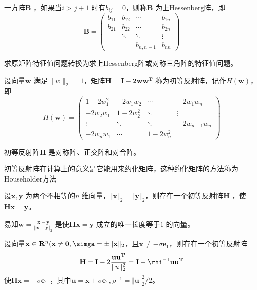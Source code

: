 \documentclass[a4paper]{article}
\begin{document}
\begin{definition}
	一方阵$\mathbf{B}$ ，如果当$i > j+1$ 时有$b_{ij} = 0$，则称$\mathbf{B}$ 为上Hessenberg阵，即
	\[
	\mathbf{B} = \begin{pmatrix} 
		b_{11} & b_{12} & \cdots & b_{1n} \\
		b_{21} & b_{22} & \cdots & b_{2n} \\
		       & \ddots & \ddots & \vdots \\
		       & & b_{n, n-1} & b_{nn}
		\end{pmatrix} 
	\] 
\end{definition}

求原矩阵特征值问题转换为求上Hessenberg阵或对称三角阵的特征值问题。

\begin{definition}
	设向量$\mathbf{w}$ 满足$\| w \|_2 = 1$，矩阵$\mathbf{H = I - 2 w w^{T}}$ 称为初等反射阵，记作$H(\mathbf{w})$，即
	\[
	H(\mathbf{w}) = \begin{pmatrix} 
		1 - 2 w_1^2 & -2 w_1 w_2 & \cdots & -2 w_1 w_n \\
		-2 w_2 w_1 & 1 - 2 w_2^2 & \ddots & \vdots \\
		\vdots & \ddots & \ddots & -2 w_{n-1} w_n \\
		-2 w_n w_1 & \cdots & 1 - 2 w_n^2
	\end{pmatrix} 
	\] 
\end{definition}

\begin{theorem}
	初等反射阵$\mathbf{H}$ 是对称阵、正交阵和对合阵。
\end{theorem}

初等反射阵在计算上的意义是它能用来约化矩阵，这种约化矩阵的方法称为Householder方法

\begin{theorem}
	设$\mathbf{x,y}$ 为两个不相等的$n$ 维向量，$\Vert \mathbf{x} \Vert_2 = \Vert \mathbf{y} \Vert_2$，则存在一个初等反射阵$\mathbf{H}$ ，使$\mathbf{Hx = y}$。
\end{theorem}
易知$\mathbf{w} = \frac{\mathbf{x - y}}{\Vert \mathbf{x - y} \Vert_2}$ 是使$\mathbf{Hx = y}$ 成立的唯一长度等于$1$ 的向量。

设向量$\mathbf{x} \in \mathbf{R}^{n}(\mathbf{x \neq 0}, \simga = \pm \Vert \mathbf{x} \Vert_2$，且$\mathbf{x} \neq -\sigma \mathbf{e}_1$，则存在一个初等反射阵
\[
\mathbf{H} = \mathbf{I} - 2 \frac{\mathbf{uu^{T}}}{\Vert u \Vert_2^2} = \mathbf{I} - \rhi^{-1} \mathbf{uu^{T}}
\] 
使$\mathbf{Hx} = - \sigma \mathbf{e}_1$ ，其中$\mathbf{u} = \mathbf{x} + \sigma \mathbf{e}_1, \rho^{-1} = \Vert \mathbf{u} \Vert_2^2 / 2$。
\end{document}
